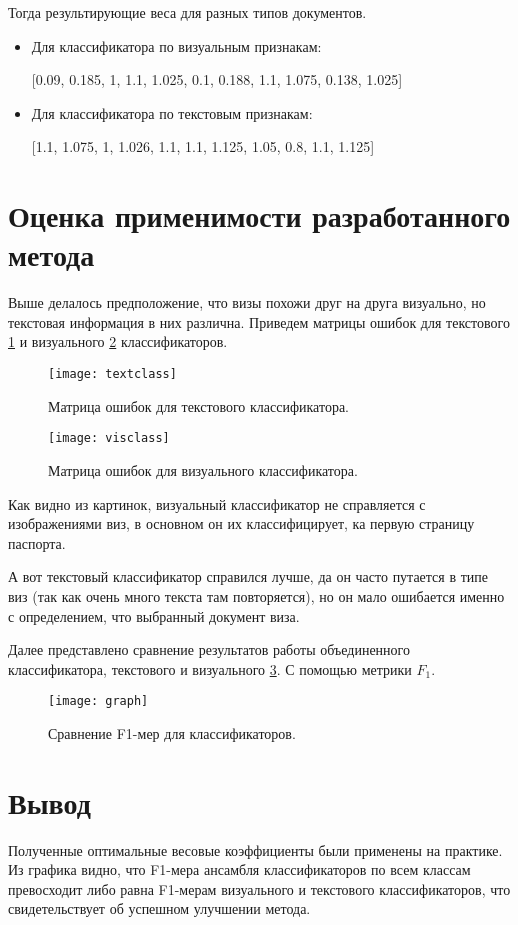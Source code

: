 Тогда результирующие веса для разных типов документов.
\begin{itemize}
\item Для классификатора по визуальным признакам:

[0.09, 0.185, 1, 1.1, 1.025, 0.1, 0.188, 1.1, 1.075, 0.138, 1.025]

\item Для классификатора по текстовым признакам: 

[1.1, 1.075, 1, 1.026, 1.1, 1.1, 1.125, 1.05, 0.8, 1.1, 1.125]
\end{itemize}

\section{Оценка применимости разработанного метода}

Выше делалось предположение, что визы похожи друг на друга визуально, но текстовая информация в них различна. Приведем матрицы ошибок для текстового \ref{img:textclass} и визуального \ref{img:visclass} классификаторов.

\begin{figure}[H]
	\centering
	\texttt{[image: textclass]}
	\caption{Матрица ошибок для текстового классификатора. }
	\label{img:textclass}
\end{figure}

\begin{figure}[H]
	\centering
	\texttt{[image: visclass]}
	\caption{Матрица ошибок для визуального классификатора. }
	\label{img:visclass}
\end{figure}

Как видно из картинок, визуальный классификатор не справляется с изображениями виз, в основном он их классифицирует, ка первую страницу паспорта.

А вот текстовый классификатор справился лучше, да он часто путается в типе виз (так как очень много текста там повторяется), но он мало ошибается именно с определением, что выбранный документ виза.

Далее представлено сравнение результатов работы объединенного классификатора, текстового и визуального \ref{img:graph}. С помощью метрики $F_1$.

\begin{figure}[H]
	\centering
	\texttt{[image: graph]}
	\caption{Сравнение F1-мер для классификаторов. }
	\label{img:graph}
\end{figure}

\section{Вывод}

Полученные оптимальные весовые коэффициенты были применены на практике. Из графика видно, что F1-мера ансамбля классификаторов по всем классам превосходит либо равна F1-мерам визуального и текстового классификаторов, что свидетельствует об успешном улучшении метода.
